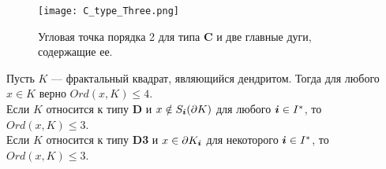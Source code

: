 \begin{figure}[H]
    \centering
    \texttt{[image: C\_type\_Three.png]}
    \caption{Угловая точка порядка 2 для типа {\bf C} и две главные дуги, содержащие ее.} 
    \label{fig:C_type_Three}
\end{figure}


\begin{theorem}\label{order}
Пусть $K$ --- фрактальный квадрат, являющийся дендритом. 
Тогда для любого  $x\in K$ верно $Ord(x,K)\le 4$.\\
Если $K$ относится к типу {\bf D} и $x\notin S_{\bm{i}}(\partial K)$ для любого ${\bm{i}}\in I^*$, то $Ord(x,K)\le 3$.\\
Если $K$ относится к типу {\bf D3} и $x\in \partial K_{\bm{i}}$ для некоторого ${\bm{i}}\in I^*$, то $Ord(x, K)\le 3$.
\end{theorem}

